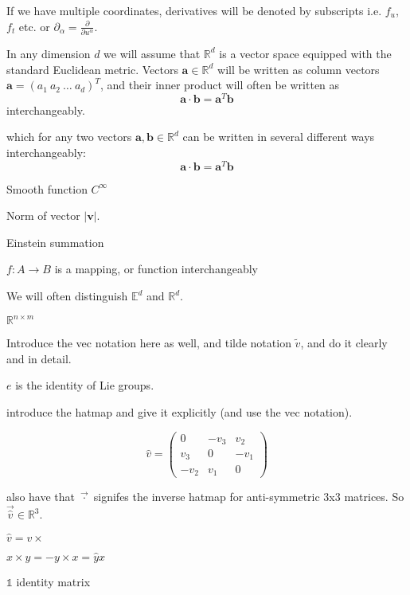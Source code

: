 \documentclass[withindex,glossary,techreport]{cam-thesis}
\begin{document}
If we have multiple coordinates, derivatives will be denoted by subscripts i.e. $f_u$, $f_t$ etc. or $\partial_\alpha = \frac{\partial}{\partial u^\alpha}$.

In any dimension $d$ we will assume that $\mathbb{R}^d$ is a vector space equipped with the standard Euclidean metric. Vectors $\mathbf{a} \in \mathbb{R}^d$ will be written as column vectors $\mathbf{a} = (a_1\ a_2\ \dots\ a_d)^T$, and their inner product will often be written as
\begin{equation}
\mathbf{a} \cdot \mathbf{b} = \mathbf{a}^T \mathbf{b}
\end{equation}
interchangeably.

which for any two vectors $\mathbf{a},\mathbf{b}\in \mathbb{R}^d$ can be written in several different ways interchangeably:
\begin{equation}
\mathbf{a} \cdot \mathbf{b} = \mathbf{a}^T \mathbf{b}
\end{equation}

Smooth function $C^\infty$

Norm of vector $|\mathbf{v}|$.

Einstein summation

$f : A \to B$ is a mapping, or function interchangeably

We will often distinguish $\mathbb{E}^d$ and $\mathbb{R}^d$. 

$\mathbb{R}^{n \times m}$

Introduce the vec notation here as well, and tilde notation $\tilde{v}$, and do it clearly and in detail.

$e$ is the identity of Lie groups.

introduce the hatmap and give it explicitly (and use the vec notation). 

\begin{equation}
\hat{v} = \begin{pmatrix}
0 & -v_3 & v_2 \\
v_3 & 0 & - v_1 \\
- v_2 & v_1 & 0
\end{pmatrix}
\end{equation}

also have that $\vec{\cdot}$ signifes the inverse hatmap for anti-symmetric 3x3 matrices. So $\vec{\hat{v}} \in \mathbb{R}^{3}$.

$\hat{v} = v \times$

$x \times y = - y \times x =  \hat{y} x$

$\mathbb{1}$ identity matrix
\end{document}
